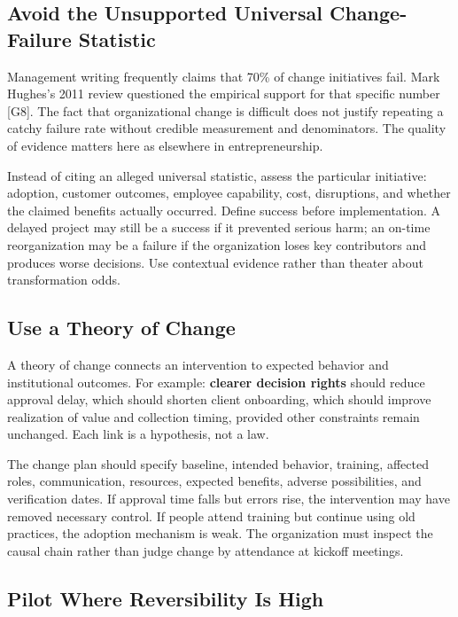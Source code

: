 \subsection{Avoid the Unsupported Universal Change-Failure Statistic}
\label{sec:unsupported_failure_statistic}

Management writing frequently claims that 70\% of change initiatives fail. Mark Hughes's 2011 review questioned the empirical support for that specific number [G8]. The fact that organizational change is difficult does not justify repeating a catchy failure rate without credible measurement and denominators. The quality of evidence matters here as elsewhere in entrepreneurship.

Instead of citing an alleged universal statistic, assess the particular initiative: adoption, customer outcomes, employee capability, cost, disruptions, and whether the claimed benefits actually occurred. Define success before implementation. A delayed project may still be a success if it prevented serious harm; an on-time reorganization may be a failure if the organization loses key contributors and produces worse decisions. Use contextual evidence rather than theater about transformation odds.

\subsection{Use a Theory of Change}
\label{sec:theory_of_change}

A theory of change connects an intervention to expected behavior and institutional outcomes. For example: \textbf{clearer decision rights} should reduce approval delay, which should shorten client onboarding, which should improve realization of value and collection timing, provided other constraints remain unchanged. Each link is a hypothesis, not a law.

The change plan should specify baseline, intended behavior, training, affected roles, communication, resources, expected benefits, adverse possibilities, and verification dates. If approval time falls but errors rise, the intervention may have removed necessary control. If people attend training but continue using old practices, the adoption mechanism is weak. The organization must inspect the causal chain rather than judge change by attendance at kickoff meetings.

\subsection{Pilot Where Reversibility Is High}
\label{sec:pilot_high_reversibility}

